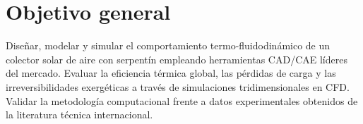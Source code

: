 \section{Objetivo general}
\label{sec:cap01_objetivo_general}

Diseñar, modelar y simular el comportamiento termo-fluidodinámico de un colector solar de aire con serpentín empleando herramientas CAD/CAE líderes del mercado.
Evaluar la eficiencia térmica global, las pérdidas de carga y las irreversibilidades exergéticas a través de simulaciones tridimensionales en CFD.
Validar la metodología computacional frente a datos experimentales obtenidos de la literatura técnica internacional.
